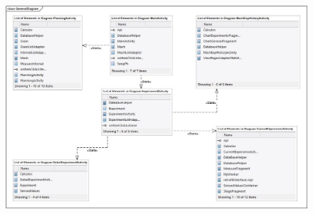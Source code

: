         \begin{figure}
        \centering
        \includegraphics[scale=0.5, angle=90]{Anexo/DiagramasClase/GeneralDiagram.jpg}
        \label{fig:DiagGeneral}
        \end{figure}
    
    
    
